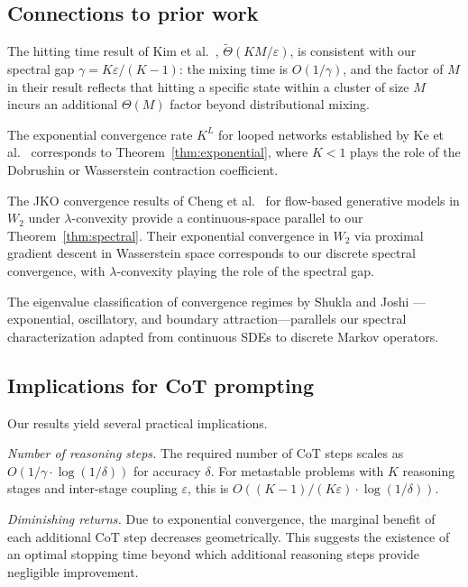 \subsection{Connections to prior work}

The hitting time result of Kim et al.\ \cite{kim2025metastable},
$\widetilde{\Theta}(KM/\varepsilon)$, is consistent with our spectral gap
$\gamma = K\varepsilon/(K-1)$: the mixing time is $O(1/\gamma)$, and the
factor of $M$ in their result reflects that hitting a specific state within a
cluster of size $M$ incurs an additional $\Theta(M)$ factor beyond
distributional mixing.

The exponential convergence rate $K^L$ for looped networks established by
Ke et al.\ \cite{ke2024fixed} corresponds to
Theorem~\ref{thm:exponential}, where $K < 1$ plays the role of the Dobrushin
or Wasserstein contraction coefficient.

The JKO convergence results of Cheng et al.\ \cite{cheng2024convergence} for
flow-based generative models in $W_2$ under $\lambda$-convexity provide a
continuous-space parallel to our Theorem~\ref{thm:spectral}. Their exponential
convergence in $W_2$ via proximal gradient descent in Wasserstein space
corresponds to our discrete spectral convergence, with $\lambda$-convexity
playing the role of the spectral gap.

The eigenvalue classification of convergence regimes by Shukla and Joshi
\cite{shukla2025sde}---exponential, oscillatory, and boundary
attraction---parallels our spectral characterization adapted from continuous
SDEs to discrete Markov operators.

\subsection{Implications for CoT prompting}

Our results yield several practical implications.

\emph{Number of reasoning steps.} The required number of CoT steps scales as
$O(1/\gamma \cdot \log(1/\delta))$ for accuracy $\delta$. For metastable
problems with $K$ reasoning stages and inter-stage coupling $\varepsilon$,
this is $O((K-1)/(K\varepsilon) \cdot \log(1/\delta))$.

\emph{Diminishing returns.} Due to exponential convergence, the marginal
benefit of each additional CoT step decreases geometrically. This suggests the
existence of an optimal stopping time beyond which additional reasoning steps
provide negligible improvement.

